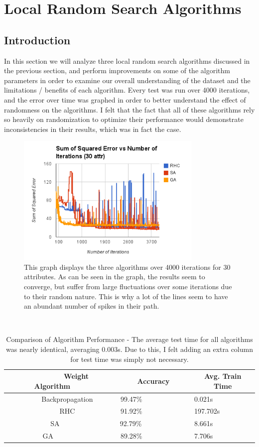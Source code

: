 \documentclass[annual]{acmsiggraph}
\begin{document}
\section{Local Random Search Algorithms}
\subsection{Introduction}
In this section we will analyze three local random search algorithms discussed in the previous section, and perform
improvements on some of the algorithm parameters in order to examine our overall understanding of the dataset and
the limitations / benefits of each algorithm. Every test was run over 4000 iterations, and the error over time was
graphed in order to better understand the effect of randomness on the algorithms. I felt that the fact that all of
these algorithms rely so heavily on randomization to optimize their performance would demonstrate inconsistencies
in their results, which was in fact the case. 
\begin{figure}[ht]
  \centering
  \includegraphics[width=3.5in]{charts/g1_error_vs_iteration_for_rhc_sa_ga_30_attr.png}
  \caption{This graph displays the three algorithms over 4000 iterations for 30 attributes. As can be seen in the graph, 
  the results seem to converge, but suffer from large fluctuations over some iterations due to their random nature. This
  is why a lot of the lines seem to have an abundant number of spikes in their path.}
  \label{fig:g1}
\end{figure}
\begin{table}
    \begin{tabular}{|c|c|c|}
  \hline
        Weight Algorithm    & Accuracy             & Avg. Train Time   \\ \hline
        Backpropagation     & 99.47\%              & 0.021s            \\ 
        RHC                 & 91.92\%              & 197.702s          \\ 
        SA                  & 92.79\%              & 8.661s            \\ 
        GA                  & 89.28\%              & 7.706s            \\
  \hline \end{tabular}
  \caption {Comparison of Algorithm Performance - The average test time for all algorithms was
            nearly identical, averaging 0.003s. Due to this, I felt adding an extra column for
            test time was simply not necessary.} \label{tab:t1l}
  \label{tb:t1}
\end{table}
\end{document}
